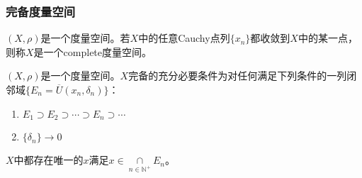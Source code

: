 \subsubsection{完备度量空间}
\begin{definition}
	$(X,\rho)$是一个度量空间。若$X$中的任意Cauchy点列$\{x_n\}$都收敛到$X$中的某一点，则称$X$是一个\gls{complete}度量空间。
\end{definition}
\begin{theorem}[闭球套定理]
	$(X,\rho)$是一个度量空间。$X$完备的充分必要条件为对任何满足下列条件的一列闭邻域$\{E_n=\overline{U}(x_n,\delta_n)\}$：
	\begin{enumerate}
		\item $E_1\supset E_2\supset\cdots\supset E_n\supset\cdots$
		\item $\{\delta_n\}\to0$
	\end{enumerate}
	$X$中都存在唯一的$x$满足$x\in\underset{n\in\mathbb{N}^+}{\cap}E_n$。
\end{theorem}
